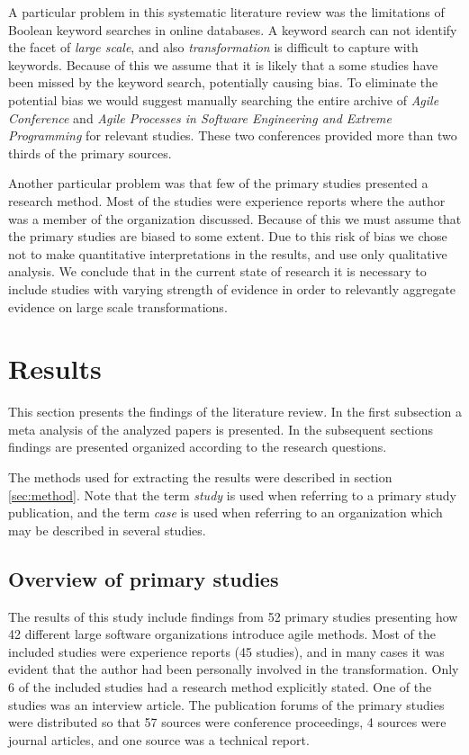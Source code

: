 A particular problem in this systematic literature review was the limitations of
Boolean keyword searches in online databases. A keyword search can not identify
the facet of \emph{large scale}, and also \emph{transformation} is difficult to
capture with keywords. Because of this we assume that it is likely that a some
studies have been missed by the keyword search, potentially causing bias. To
eliminate the potential bias we would suggest manually searching the entire
archive of \emph{Agile Conference} and \emph{Agile Processes in Software
Engineering and Extreme Programming} for relevant studies. These two conferences
provided more than two thirds of the primary sources.

Another particular problem was that few of the primary studies presented a
research method. Most of the studies were experience reports where the author
was a member of the organization discussed. Because of this we must assume that
the primary studies are biased to some extent. Due to this risk of bias we chose
not to make quantitative interpretations in the results, and use only
qualitative analysis. We conclude that in the current state of research it is
necessary to include studies with varying strength of evidence in order to
relevantly aggregate evidence on large scale transformations.


\clearpage

\section{Results}
\label{sec:results}

This section presents the findings of the literature review. In the first
subsection a meta analysis of the analyzed papers is presented. In the
subsequent sections findings are presented organized according to the research
questions.

The methods used for extracting the results were described in section
\ref{sec:method}. Note that the term \emph{study} is used when referring to a
primary study publication, and the term \emph{case} is used when referring to an
organization which may be described in several studies.

\subsection{Overview of primary studies}

The results of this study include findings from 52 primary studies presenting
how 42 different large software organizations introduce agile methods. Most of
the included studies were experience reports (45 studies), and in many cases it
was evident that the author had been personally involved in the transformation.
Only 6 of the included studies had a research method explicitly stated. One of
the studies was an interview article. The publication forums of the primary
studies were distributed so that 57 sources were conference proceedings, 4
sources were journal articles, and one source was a technical report.

